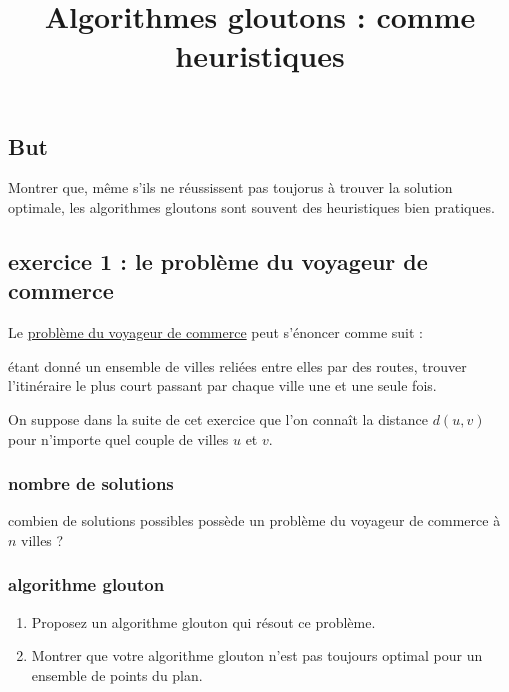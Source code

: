 \documentclass[
]{article}
\title{Algorithmes gloutons : comme heuristiques}
\author{}
\date{}
\providecommand{\tightlist}{%
  \setlength{\itemsep}{0pt}\setlength{\parskip}{0pt}}
\begin{document}
\maketitle

\hypertarget{but}{%
\subsection{But}\label{but}}

Montrer que, même s'ils ne réussissent pas toujorus à trouver la
solution optimale, les algorithmes gloutons sont souvent des
heuristiques bien pratiques.


\hypertarget{exercice-1-le-probluxe8me-du-voyageur-de-commerce}{%
\subsection{exercice 1 : le problème du voyageur de
commerce}\label{exercice-1-le-probluxe8me-du-voyageur-de-commerce}}

Le
\href{https://fr.wikipedia.org/wiki/Probl\%C3\%A8me_du_voyageur_de_commerce}{problème
du voyageur de commerce} peut s'énoncer comme suit :

étant donné un ensemble de villes reliées entre elles par des routes,
trouver l'itinéraire le plus court passant par chaque ville une et une
seule fois.

On suppose dans la suite de cet exercice que l'on connaît la distance
\(d(u, v)\) pour n'importe quel couple de villes \(u\) et \(v\).

\hypertarget{nombre-de-solutions}{%
\subsubsection{nombre de solutions}\label{nombre-de-solutions}}

combien de solutions possibles possède un problème du voyageur de
commerce à \(n\) villes ?

\hypertarget{algorithme-glouton}{%
\subsubsection{algorithme glouton}\label{algorithme-glouton}}

\begin{enumerate}
\def\labelenumi{\arabic{enumi}.}
\tightlist
\item
  Proposez un algorithme glouton qui résout ce problème.
\item
  Montrer que votre algorithme glouton n'est pas toujours optimal pour
  un ensemble de points du plan.
\end{enumerate}
\end{document}
